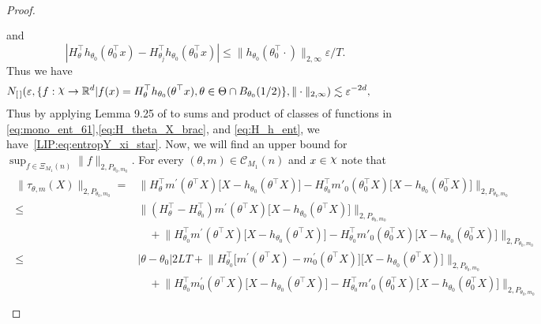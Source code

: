 {\begin{proof}
\begin{align}
\begin{split}
\end{split}
\end{align}
and
\begin{equation}\label{eq:H_h_0}
|H_\theta^\top h_{\theta_0}(\theta_0^\top x)-H_{\theta_j}^\top h_{\theta_0}(\theta_0^\top x)| \le  \|h_{\theta_0}(\theta_0^\top \cdot)\|_{2, \infty}\varepsilon/ T.
\end{equation}
Thus we have
{\small \begin{align}
 N_{[\,]}(\varepsilon, \{f:\rchi\rightarrow \R^d| f(x)=H_\theta^\top h_{\theta_0}(\theta^\top x),  \theta \in \Theta\cap B_{\theta_0}(1/2) \}, \|\cdot\|_{2,\infty}) &\lesssim \varepsilon^{-2d}, \qquad\label{eq:H_h_ent}
\end{align}}
Thus by applying Lemma 9.25 of \cite{Kosorok08} to sums and product of classes of functions in \eqref{eq:mono_ent_61},\eqref{eq:H_theta_X_brac}, and \eqref{eq:H_h_ent}, we have~\eqref{LIP:eq:entropY_xi_star}. Now, we will find an upper bound for $\sup_{f \in \Xi_{M_1}(n)} \|f\|_{2,P_{\theta_0, m_0}}$.  For every $(\theta, m) \in \mathcal{C}_{M_1}(n)$  and $x \in \rchi$ note that 
\begin{align}\label{eq:L_2_bound}
\begin{split}
 \|\tau_{\theta, m}(X)\|_{2, P_{\theta_0, m_0}} ={}& \Big\|H_{\theta}^\top m^\prime (\theta^\top X) \big[X- h_{\theta_0} (\theta^\top X)\big] - H_{\theta_0}^\top m'_0(\theta_0^\top X)\big[ X- h_{\theta_0}(\theta_0^\top X)\big]\Big\|_{2, P_{\theta_0, m_0}}\\
  \le{}& \Big\|(H_{\theta}^\top - H_{\theta_0}^\top)m^\prime (\theta^\top X) \big[X- h_{\theta_0} (\theta^\top X)\big] \Big\|_{2, P_{\theta_0, m_0}}\\
  &\quad + \Big\|H_{\theta_0}^\top m^\prime (\theta^\top X) \big[X- h_{\theta_0} (\theta^\top X)\big] - H_{\theta_0}^\top m'_0(\theta_0^\top X)\big[ X- h_{\theta_0}(\theta_0^\top X)\big]\Big\|_{2, P_{\theta_0, m_0}}\\
    \le{}& |\theta -\theta_0| 2 L T+ \Big\|H_{\theta_0}^\top \big[m^\prime (\theta^\top X) -m_0^\prime (\theta^\top X)\big] \big[X- h_{\theta_0} (\theta^\top X)\big]\Big\|_{2, P_{\theta_0, m_0}}\\
  &\quad + \Big\|H_{\theta_0}^\top m_0^\prime (\theta^\top X) \big[X- h_{\theta_0} (\theta^\top X)\big] - H_{\theta_0}^\top m'_0(\theta_0^\top X)\big[ X- h_{\theta_0}(\theta_0^\top X)\big]\Big\|_{2, P_{\theta_0, m_0}}\\

\end{split}
\end{align}
\end{proof}}
